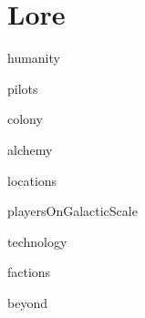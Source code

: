 \part{Lore}

{humanity}
\newpage

{pilots}
\newpage

{colony}
\newpage

{alchemy}
\newpage

{locations}
\newpage

{playersOnGalacticScale}
\newpage

{technology}
\newpage

{factions}
\newpage

{beyond}
\newpage